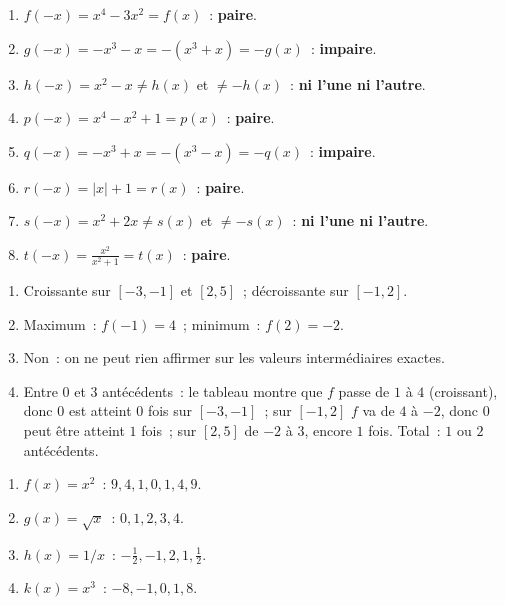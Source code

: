 \begin{enumerate}
  \item $f(-x)=x^4-3x^2=f(x)$~: \textbf{paire}.
  \item $g(-x)=-x^3-x=-(x^3+x)=-g(x)$~: \textbf{impaire}.
  \item $h(-x)=x^2-x\ne h(x)$ et $\ne-h(x)$~: \textbf{ni l'une ni l'autre}.
  \item $p(-x)=x^4-x^2+1=p(x)$~: \textbf{paire}.
  \item $q(-x)=-x^3+x=-(x^3-x)=-q(x)$~: \textbf{impaire}.
  \item $r(-x)=|x|+1=r(x)$~: \textbf{paire}.
  \item $s(-x)=x^2+2x\ne s(x)$ et $\ne-s(x)$~: \textbf{ni l'une ni l'autre}.
  \item $t(-x)=\frac{x^2}{x^2+1}=t(x)$~: \textbf{paire}.
\end{enumerate}


\begin{enumerate}
  \item Croissante sur $[-3,-1]$ et $[2,5]$~; d\'ecroissante sur $[-1,2]$.
  \item Maximum~: $f(-1)=4$~; minimum~: $f(2)=-2$.
  \item Non~: on ne peut rien affirmer sur les valeurs interm\'ediaires exactes.
  \item Entre $0$ et $3$ ant\'ec\'edents~: le tableau montre que $f$ passe de $1$ \`a $4$
        (croissant), donc $0$ est atteint 0 fois sur $[-3,-1]$~; sur $[-1,2]$ $f$ va de $4$ \`a $-2$,
        donc $0$ peut \^etre atteint $1$ fois~; sur $[2,5]$ de $-2$ \`a $3$, encore $1$ fois.
        Total~: $1$ ou $2$ ant\'ec\'edents.
\end{enumerate}


\begin{enumerate}
  \item $f(x)=x^2$~: $9,4,1,0,1,4,9$.
  \item $g(x)=\sqrt{x}$~: $0,1,2,3,4$.
  \item $h(x)=1/x$~: $-\frac{1}{2},-1,2,1,\frac{1}{2}$.
  \item $k(x)=x^3$~: $-8,-1,0,1,8$.
\end{enumerate}


